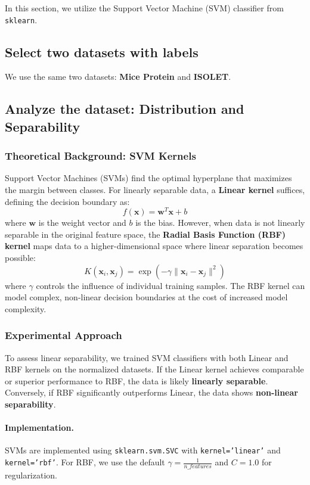 \documentclass[12pt]{article}
\begin{document}
In this section, we utilize the Support Vector Machine (SVM) classifier from \texttt{sklearn}.

\subsection{Select two datasets with labels}
We use the same two datasets: \textbf{Mice Protein} and \textbf{ISOLET}.

\subsection{Analyze the dataset: Distribution and Separability}

\subsubsection{Theoretical Background: SVM Kernels}
Support Vector Machines (SVMs) find the optimal hyperplane that maximizes the margin between classes. For linearly separable data, a \textbf{Linear kernel} suffices, defining the decision boundary as:
\begin{equation}
    f(\mathbf{x}) = \mathbf{w}^T\mathbf{x} + b
\end{equation}
where $\mathbf{w}$ is the weight vector and $b$ is the bias. However, when data is not linearly separable in the original feature space, the \textbf{Radial Basis Function (RBF) kernel} maps data to a higher-dimensional space where linear separation becomes possible:
\begin{equation}
    K(\mathbf{x}_i, \mathbf{x}_j) = \exp\left(-\gamma \|\mathbf{x}_i - \mathbf{x}_j\|^2\right)
\end{equation}
where $\gamma$ controls the influence of individual training samples. The RBF kernel can model complex, non-linear decision boundaries at the cost of increased model complexity.

\subsubsection{Experimental Approach}
To assess linear separability, we trained SVM classifiers with both Linear and RBF kernels on the normalized datasets. If the Linear kernel achieves comparable or superior performance to RBF, the data is likely \textbf{linearly separable}. Conversely, if RBF significantly outperforms Linear, the data shows \textbf{non-linear separability}.

\paragraph{Implementation.} SVMs are implemented using \texttt{sklearn.svm.SVC} with \texttt{kernel='linear'} and \texttt{kernel='rbf'}. For RBF, we use the default $\gamma = \frac{1}{n\_features}$ and $C=1.0$ for regularization.
\end{document}

